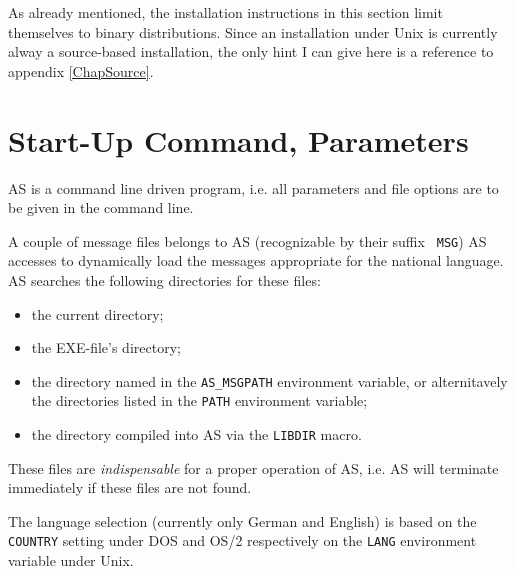 \documentclass[12pt,twoside]{report}
\begin{document}
As already mentioned, the installation instructions in this section limit
themselves to binary distributions.  Since an installation under Unix
 is currently alway a source-based installation, the
only hint I can give here is a reference to appendix \ref{ChapSource}.


\section{Start-Up Command, Parameters}
\label{SectCallConvention}

AS is a command line driven program, i.e. all parameters and file
options are to be given in the command line.  

A couple of message files belongs to AS (recognizable by their suffix {\tt
MSG}) AS accesses to dynamically load the messages appropriate for the
national language.  AS searches the following directories for these files:
\begin{itemize}
\item{the current directory;}
\item{the EXE-file's directory;}
\item{the directory named in the {\tt AS\_MSGPATH} environment variable,
      or alternitavely the directories listed in the {\tt PATH} environment
      variable;}
\item{the directory compiled into AS via the {\tt LIBDIR} macro.}
\end{itemize}
These files are {\em indispensable} for a proper operation of AS, i.e. AS
will terminate immediately if these files are not found.

The language selection (currently only German and English) is based on the
{\tt COUNTRY} setting under DOS and OS/2 respectively on the {\tt LANG}
environment variable under Unix.
\end{document}
